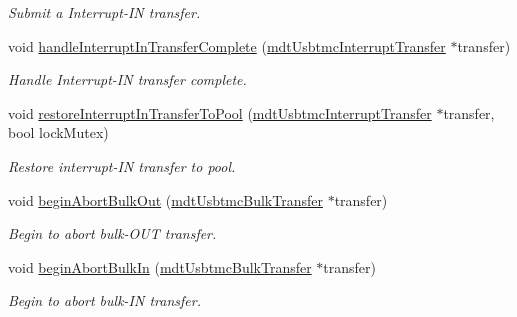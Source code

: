 \begin{DoxyCompactItemize}
\begin{DoxyCompactList}\small\item\em Submit a Interrupt-\/\-I\-N transfer. \end{DoxyCompactList}\item 
void \hyperlink{classmdt_usbtmc_transfer_handler_a3fc38242a748718af60bc9f4ba7f8e70}{handle\-Interrupt\-In\-Transfer\-Complete} (\hyperlink{classmdt_usbtmc_interrupt_transfer}{mdt\-Usbtmc\-Interrupt\-Transfer} $\ast$transfer)
\begin{DoxyCompactList}\small\item\em Handle Interrupt-\/\-I\-N transfer complete. \end{DoxyCompactList}\item 
void \hyperlink{classmdt_usbtmc_transfer_handler_ae08cf5159b0005f8fd6e7818e9cba72c}{restore\-Interrupt\-In\-Transfer\-To\-Pool} (\hyperlink{classmdt_usbtmc_interrupt_transfer}{mdt\-Usbtmc\-Interrupt\-Transfer} $\ast$transfer, bool lock\-Mutex)
\begin{DoxyCompactList}\small\item\em Restore interrupt-\/\-I\-N transfer to pool. \end{DoxyCompactList}\item 
void \hyperlink{classmdt_usbtmc_transfer_handler_a515dc223a766b5a88e4b9083d0dba287}{begin\-Abort\-Bulk\-Out} (\hyperlink{classmdt_usbtmc_bulk_transfer}{mdt\-Usbtmc\-Bulk\-Transfer} $\ast$transfer)
\begin{DoxyCompactList}\small\item\em Begin to abort bulk-\/\-O\-U\-T transfer. \end{DoxyCompactList}\item 
void \hyperlink{classmdt_usbtmc_transfer_handler_a32ef47f660e61d26d4fbf48c126ad5c4}{begin\-Abort\-Bulk\-In} (\hyperlink{classmdt_usbtmc_bulk_transfer}{mdt\-Usbtmc\-Bulk\-Transfer} $\ast$transfer)
\begin{DoxyCompactList}\small\item\em Begin to abort bulk-\/\-I\-N transfer. \end{DoxyCompactList}\end{DoxyCompactItemize}

